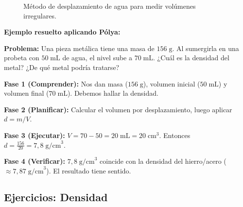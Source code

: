 \documentclass[12pt, a4paper]{article}
\begin{document}
\begin{figure}[h!]
  \caption{Método de desplazamiento de agua para medir volúmenes irregulares.}
  \label{fig:arquimedes}
\end{figure}

\noindent\textbf{Ejemplo resuelto aplicando Pólya:}

\textbf{Problema:} Una pieza metálica tiene una masa de $156\;\text{g}$. Al sumergirla en una probeta con $50\;\text{mL}$ de agua, el nivel sube a $70\;\text{mL}$. ¿Cuál es la densidad del metal? ¿De qué metal podría tratarse?

\begin{cuadrosolucion}
\textbf{Fase 1 (Comprender):} Nos dan masa ($156\;\text{g}$), volumen inicial ($50\;\text{mL}$) y volumen final ($70\;\text{mL}$). Debemos hallar la densidad.

\textbf{Fase 2 (Planificar):} Calcular el volumen por desplazamiento, luego aplicar $d = m/V$.

\textbf{Fase 3 (Ejecutar):} $V = 70 - 50 = 20\;\text{mL} = 20\;\text{cm}^3$. Entonces $d = \frac{156}{20} = 7{,}8\;\text{g/cm}^3$.

\textbf{Fase 4 (Verificar):} $7{,}8\;\text{g/cm}^3$ coincide con la densidad del hierro/acero ($\approx 7{,}87\;\text{g/cm}^3$). El resultado tiene sentido.
\end{cuadrosolucion}

\newpage

\subsection{Ejercicios: Densidad}
\end{document}
